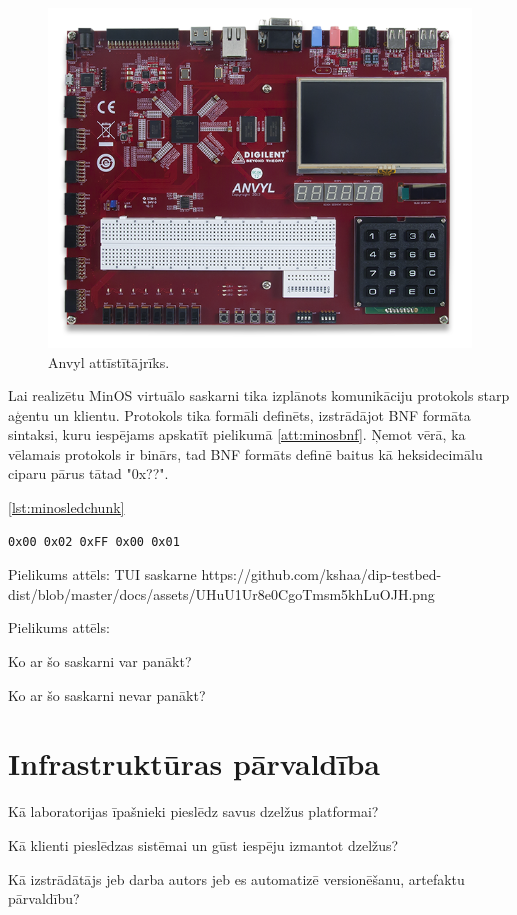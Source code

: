 \begin{figure}[H]
    \includegraphics[width=0.7\linewidth]{assets/anvyl.png}
    \centering
    \caption{Anvyl attīstītājrīks.}
    \label{fig:anvyl}
\end{figure}

Lai realizētu MinOS virtuālo saskarni tika izplānots komunikāciju protokols
starp aģentu un klientu. Protokols tika formāli definēts, izstrādājot BNF
formāta sintaksi, kuru iespējams apskatīt pielikumā \ref{att:minosbnf}. Ņemot
vērā, ka vēlamais protokols ir binārs, tad BNF formāts definē baitus kā
heksidecimālu ciparu pārus tātad "0x??".

\ref{lst:minosledchunk}

\begin{lstlisting}[caption={MinOS LED gaismu pakete},label={lst:minosledchunk},captionpos=b]
    0x00 0x02 0xFF 0x00 0x01 
\end{lstlisting}

Pielikums attēls: TUI saskarne https://github.com/kshaa/dip-testbed-dist/blob/master/docs/assets/UHuU1Ur8e0CgoTmsm5khLuOJH.png

Pielikums attēls: 

Ko ar šo saskarni var panākt?

Ko ar šo saskarni nevar panākt?

\section{Infrastruktūras pārvaldība}
\label{sec:ops}

Kā laboratorijas īpašnieki pieslēdz savus dzelžus platformai?

Kā klienti pieslēdzas sistēmai un gūst iespēju izmantot dzelžus?

Kā izstrādātājs jeb darba autors jeb es automatizē versionēšanu, artefaktu pārvaldību?

